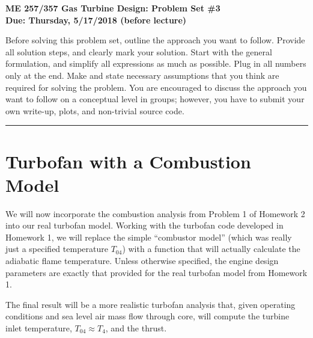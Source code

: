 \documentclass[11pt]{article}
\def\hwnum{3}
\begin{document}
\begin{center}
{\Large\bf ME 257/357 Gas Turbine Design: Problem Set \#\hwnum\\
       Due: Thursday, 5/17/2018 (before lecture)}
\end{center}

Before solving this problem set, outline the approach you want to follow. Provide all solution steps, and clearly mark your solution. Start with the general formulation, and simplify all expressions as much as possible. Plug in all numbers only at the end. Make and state necessary assumptions that you
think are required for solving the problem. You are encouraged to discuss the approach you want to follow on a conceptual level in groups; however, you have to submit your own write-up, plots, and non-trivial source code.
\\
\hrule
\vspace{2mm}
\noindent
\section{Turbofan with a Combustion Model}

We will now incorporate the combustion analysis from Problem 1 of Homework 2 into our real turbofan model. Working with the turbofan code developed in Homework 1, we will replace the simple ``combustor model” (which was really just a specified temperature $T_{04}$) with a function that will actually calculate the adiabatic flame temperature. Unless otherwise specified, the engine design parameters are exactly that provided for the real turbofan model from Homework 1.

The final result will be a more realistic turbofan analysis that, given operating conditions and sea level air mass flow through core, will compute the turbine inlet temperature, $T_{04}\approx T_{4}$, and the thrust.
\end{document}
